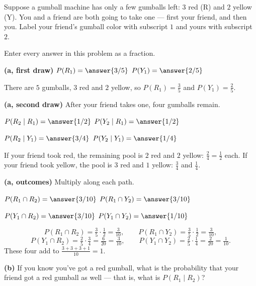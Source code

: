 \documentclass[12pt]{ximera}
\begin{document}
\begin{problem}
Suppose a gumball machine has only a few gumballs left: $3$ red (R) and $2$ yellow
(Y). You and a friend are both going to take one --- first your friend, and then you.
Label your friend's gumball color with subscript $1$ and yours with subscript $2$.

Enter every answer in this problem as a fraction.

\begin{prompt}
\textbf{(a, first draw)} $P(R_1)=\answer{3/5}$ \qquad $P(Y_1)=\answer{2/5}$

\begin{feedback}
There are $5$ gumballs, $3$ red and $2$ yellow, so $P(R_1)=\frac35$ and
$P(Y_1)=\frac25$.
\end{feedback}
\end{prompt}

\begin{prompt}
\textbf{(a, second draw)} After your friend takes one, four gumballs remain.

$P(R_2\mid R_1)=\answer{1/2}$ \qquad $P(Y_2\mid R_1)=\answer{1/2}$

\smallskip
$P(R_2\mid Y_1)=\answer{3/4}$ \qquad $P(Y_2\mid Y_1)=\answer{1/4}$

\begin{feedback}
If your friend took red, the remaining pool is $2$ red and $2$ yellow:
$\frac24=\frac12$ each. If your friend took yellow, the pool is $3$ red and $1$
yellow: $\frac34$ and $\frac14$.
\end{feedback}
\end{prompt}

\begin{prompt}
\textbf{(a, outcomes)} Multiply along each path.

$P(R_1\cap R_2)=\answer{3/10}$ \qquad $P(R_1\cap Y_2)=\answer{3/10}$

\smallskip
$P(Y_1\cap R_2)=\answer{3/10}$ \qquad $P(Y_1\cap Y_2)=\answer{1/10}$

\begin{feedback}
\[
P(R_1\cap R_2)=\tfrac35\cdot\tfrac12=\tfrac{3}{10},\qquad
P(R_1\cap Y_2)=\tfrac35\cdot\tfrac12=\tfrac{3}{10},
\]
\[
P(Y_1\cap R_2)=\tfrac25\cdot\tfrac34=\tfrac{6}{20}=\tfrac{3}{10},\qquad
P(Y_1\cap Y_2)=\tfrac25\cdot\tfrac14=\tfrac{2}{20}=\tfrac{1}{10}.
\]
These four add to $\frac{3+3+3+1}{10}=1$. \checkmark
\end{feedback}
\end{prompt}

\begin{prompt}
\textbf{(b)} If you know you've got a red gumball, what is the probability that your
friend got a red gumball as well --- that is, what is $P(R_1\mid R_2)$?


\end{prompt}
\end{problem}
\end{document}
